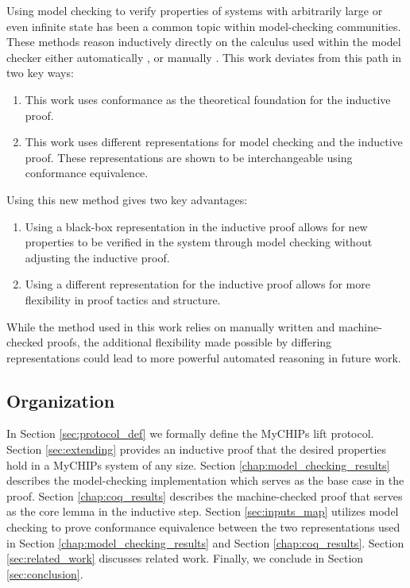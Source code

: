 \documentclass[runningheads]{llncs}
\newcommand{\secref}[1]{Section \ref{#1}}
\begin{document}
Using model checking to verify properties of systems with arbitrarily large or even infinite state has been a common topic within model-checking communities. These methods reason inductively directly on the calculus used within the model checker either automatically \cite{reasoning_many_proc}\cite{liveness_inf_state}, or manually \cite{clarke_base_ismc}. This work deviates from this path in two key ways:
\begin{enumerate}
    \item This work uses conformance as the theoretical foundation for the inductive proof.
    \item This work uses different representations for model checking and the inductive proof. These representations are shown to be interchangeable using conformance equivalence.
\end{enumerate}
Using this new method gives two key advantages: 
\begin{enumerate}
    \item Using a black-box representation in the inductive proof allows for new properties to be verified in the system through model checking without adjusting the inductive proof.
    \item  Using a different representation for the inductive proof allows for more flexibility in proof tactics and structure.
\end{enumerate}

While the method used in this work relies on manually written and machine-checked proofs, the additional flexibility made possible by differing representations could lead to more powerful automated reasoning in future work.

\subsection{Organization}
In \secref{sec:protocol_def} we formally define the MyCHIPs lift protocol. \secref{sec:extending} provides an inductive proof that the desired properties hold in a MyCHIPs system of any size. \secref{chap:model_checking_results} describes the model-checking implementation which serves as the base case in the proof. \secref{chap:coq_results} describes the machine-checked proof that serves as the core lemma in the inductive step. \secref{sec:inputs_map} utilizes model checking to prove conformance equivalence between the two representations used in \secref{chap:model_checking_results} and \secref{chap:coq_results}. \secref{sec:related_work} discusses related work. Finally, we conclude in \secref{sec:conclusion}.
\end{document}

